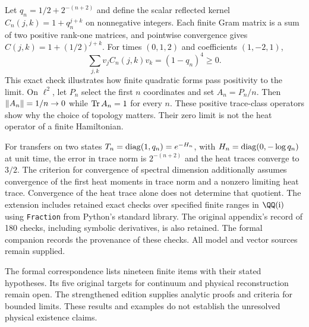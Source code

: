 Let $q_n=1/2+2^{-(n+2)}$ and define the scalar reflected kernel $C_n(j,k)=1+q_n^{j+k}$ on nonnegative integers. Each finite Gram matrix is a sum of two positive rank-one matrices, and pointwise convergence gives $C(j,k)=1+(1/2)^{j+k}$. For times $(0,1,2)$ and coefficients $(1,-2,1)$,
\[
\sum_{j,k}v_jC_n(j,k)v_k=(1-q_n)^4\geq0.
\]
This exact check illustrates how finite quadratic forms pass positivity to the limit.
On $\ell^2$, let $P_n$ select the first $n$ coordinates and set $A_n=P_n/n$. Then $\left\lVert A_n\right\rVert=1/n\to0$ while $\operatorname{Tr} A_n=1$ for every $n$. These positive trace-class operators show why the choice of topology matters. Their zero limit is not the heat operator of a finite Hamiltonian.

For transfers on two states $T_n=\operatorname{diag}(1,q_n)=e^{-H_n}$, with $H_n=\operatorname{diag}(0,-\log q_n)$ at unit time, the error in trace norm is $2^{-(n+2)}$ and the heat traces converge to $3/2$. The criterion for convergence of spectral dimension additionally assumes convergence of the first heat moments in trace norm and a nonzero limiting heat trace. Convergence of the heat trace alone does not determine that quotient.
The extension includes retained exact checks over specified finite ranges in $\QQ(\ii)$ using \texttt{Fraction} from Python's standard library. The original appendix's record of 180 checks, including symbolic derivatives, is also retained. The formal companion records the provenance of these checks. All model and vector sources remain supplied.

The formal correspondence lists nineteen finite items with their stated hypotheses. Its five original targets for continuum and physical reconstruction remain open. The strengthened edition supplies analytic proofs and criteria for bounded limits. These results and examples do not establish the unresolved physical existence claims.

\endgroup
